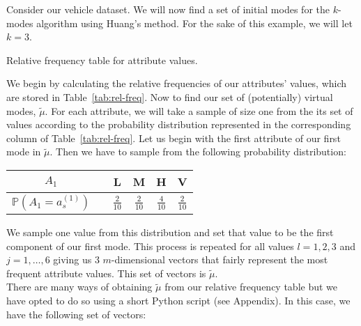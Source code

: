 \begin{example}\label{ex:huang}
    Consider our vehicle dataset. We will now find a set of initial modes for
    the \(k\)-modes algorithm using Huang's method. For the sake of this
    example, we will let \(k = 3\).\\
    
    \begin{table}[H]
    \centering
    \resizebox{.8\textwidth}{!}{%
        
    }
    \caption{Relative frequency table for attribute values.}\label{tab:rel-freq}
    \end{table}

    We begin by calculating the relative frequencies of our attributes' values,
    which are stored in Table~\ref{tab:rel-freq}. Now to find our set of
    (potentially) virtual modes, \(\tilde{\mu}\). For each attribute, we will
    take a sample of size one from the its set of values according to the
    probability distribution represented in the corresponding column of
    Table~\ref{tab:rel-freq}. Let us begin with the first attribute of our first
    mode in \(\tilde{\mu}\). Then we have to sample from the following
    probability distribution:\\
    
    \begin{table}[H]
    \centering
    \begin{tabular}{cccccc}
        \(A_{1}\) &\vline& L & M & H & V \\
        \midrule\(\mathbb{P}(A_{1} = a_s^{(1)})\) &\vline& \(\frac{2}{10}\) &
        \(\frac{2}{10}\) & \(\frac{4}{10}\) & \(\frac{2}{10}\)\\ 
    \end{tabular}
    \end{table}
    
    We sample one value from this distribution and set that value to be the
    first component of our first mode. This process is repeated for all values
    \(l = 1, 2, 3\) and \(j = 1, \ldots, 6\) giving us \(3\) \(m\)-dimensional
    vectors that fairly represent the most frequent attribute values. This set
    of vectors is \(\tilde{\mu}\).\\

    There are many ways of obtaining \(\tilde{\mu}\) from our relative frequency
    table but we have opted to do so using a short Python script (see Appendix).
    In this case, we have the following set of vectors:

    


\end{example}
